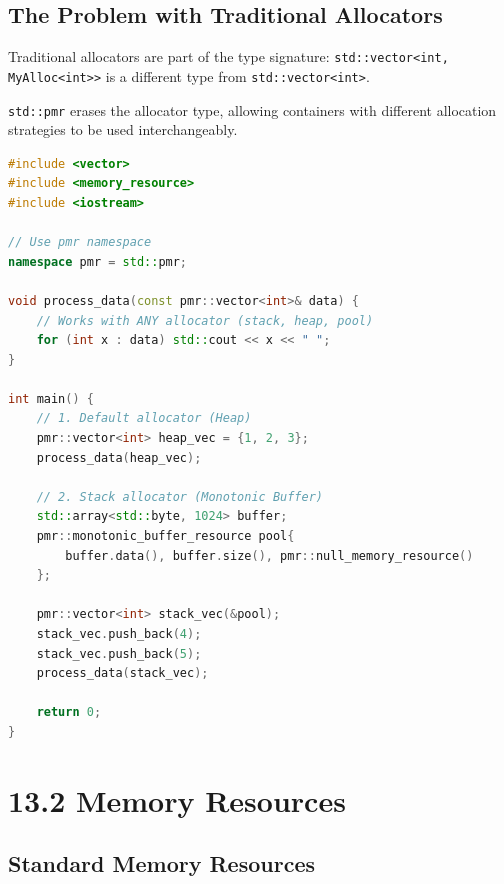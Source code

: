 \hypertarget{the-problem-with-traditional-allocators}{%
\subsection{The Problem with Traditional
Allocators}\label{the-problem-with-traditional-allocators}}

Traditional allocators are part of the type signature:
\passthrough{\lstinline!std::vector<int, MyAlloc<int>>!} is a different
type from \passthrough{\lstinline!std::vector<int>!}.

\passthrough{\lstinline!std::pmr!} erases the allocator type, allowing
containers with different allocation strategies to be used
interchangeably.

\begin{lstlisting}[language={C++}]
#include <vector>
#include <memory_resource>
#include <iostream>

// Use pmr namespace
namespace pmr = std::pmr;

void process_data(const pmr::vector<int>& data) {
    // Works with ANY allocator (stack, heap, pool)
    for (int x : data) std::cout << x << " ";
}

int main() {
    // 1. Default allocator (Heap)
    pmr::vector<int> heap_vec = {1, 2, 3};
    process_data(heap_vec);
    
    // 2. Stack allocator (Monotonic Buffer)
    std::array<std::byte, 1024> buffer;
    pmr::monotonic_buffer_resource pool{
        buffer.data(), buffer.size(), pmr::null_memory_resource()
    };
    
    pmr::vector<int> stack_vec(&pool);
    stack_vec.push_back(4);
    stack_vec.push_back(5);
    process_data(stack_vec);
    
    return 0;
}
\end{lstlisting}

\hypertarget{memory-resources}{%
\section{13.2 Memory Resources}\label{memory-resources}}

\hypertarget{standard-memory-resources}{%
\subsection{Standard Memory Resources}\label{standard-memory-resources}}

